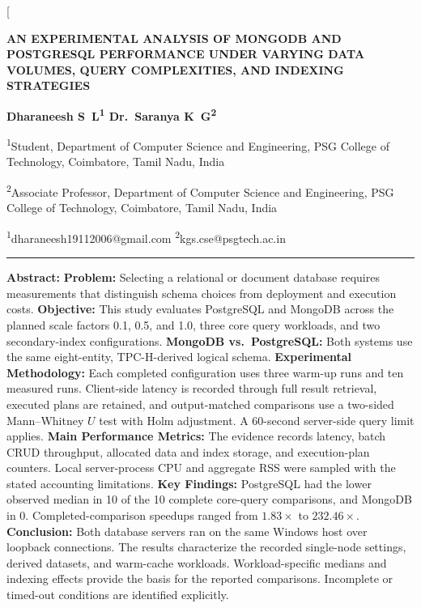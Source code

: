 \documentclass[10pt,a4paper,twocolumn]{article}
\newcommand{\PaperTitle}{An Experimental Analysis of MongoDB and PostgreSQL
  Performance Under Varying Data Volumes, Query Complexities, and Indexing Strategies}
\begin{document}

\twocolumn[%
\begin{center}
  {\fontsize{14}{17}\selectfont\bfseries\MakeUppercase{\PaperTitle}\par}
  \vspace{12pt}
  {\small\bfseries
    Dharaneesh S~L\textsuperscript{1}\qquad
    Dr.~Saranya K~G\textsuperscript{2}\par}
  \vspace{10pt}
  {\small
    \textsuperscript{1}Student,
    Department of Computer Science and Engineering,
    PSG College of Technology, Coimbatore, Tamil Nadu, India\par
    \textsuperscript{2}Associate Professor,
    Department of Computer Science and Engineering,
    PSG College of Technology, Coimbatore, Tamil Nadu, India\par}
  \vspace{8pt}
  {\small
    \textsuperscript{1}dharaneesh19112006@gmail.com\quad
    \textsuperscript{2}kgs.cse@psgtech.ac.in\par}
\end{center}
\vspace{4pt}
\noindent\rule{\textwidth}{0.5pt}
\vspace{4pt}

\noindent\textbf{Abstract:}
\textbf{Problem:} Selecting a relational or document database requires measurements that distinguish schema choices from deployment and execution costs. \textbf{Objective:} This study evaluates PostgreSQL and MongoDB across the planned scale factors 0.1, 0.5, and 1.0, three core query workloads, and two secondary-index configurations. \textbf{MongoDB vs.\ PostgreSQL:} Both systems use the same eight-entity, TPC-H-derived logical schema. \textbf{Experimental Methodology:} Each completed configuration uses three warm-up runs and ten measured runs. Client-side latency is recorded through full result retrieval, executed plans are retained, and output-matched comparisons use a two-sided Mann--Whitney $U$ test with Holm adjustment. A 60-second server-side query limit applies. \textbf{Main Performance Metrics:} The evidence records latency, batch CRUD throughput, allocated data and index storage, and execution-plan counters. Local server-process CPU and aggregate RSS were sampled with the stated accounting limitations. \textbf{Key Findings:} PostgreSQL had the lower observed median in 10 of the 10 complete core-query comparisons, and MongoDB in 0. Completed-comparison speedups ranged from $1.83\times$ to $232.46\times$. \textbf{Conclusion:} Both database servers ran on the same Windows host over loopback connections. The results characterize the recorded single-node settings, derived datasets, and warm-cache workloads. Workload-specific medians and indexing effects provide the basis for the reported comparisons. Incomplete or timed-out conditions are identified explicitly.
\end{document}
